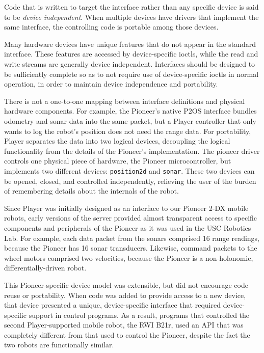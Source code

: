 Code that is written to target the interface rather than any specific
device is said to be {\em device independent}. When multiple devices have
drivers that implement the same interface, the controlling code is portable
among those devices.

Many hardware devices have unique features that do not appear in the
standard interface. These features are accessed by device-specific ioctls,
while the read and write streams are generally device independent.
Interfaces should be designed to be sufficiently complete so as to not
require use of device-specific ioctls in normal operation, in order to
maintain device independence and portability.

There is not a one-to-one mapping between interface definitions and
physical hardware components. For example, the Pioneer's native P2OS
interface bundles odometry and sonar data into the same packet, but a
Player controller that only wants to log the robot's position does
not need the range data. For portability, Player separates the data
into two logical devices, decoupling the logical functionality from
the details of the Pioneer's implementation. The pioneer driver
controls one physical piece of hardware, the Pioneer microcontroller,
but implements two different devices: {\tt position2d} and {\tt sonar}.
These two devices can be opened, closed, and controlled independently,
relieving the user of the burden of remembering details about the
internals of the robot.

Since Player was initially designed as an interface to our Pioneer 2-DX
mobile robots, early versions of the server provided almost transparent
access to specific components and peripherals of the Pioneer as it was used
in the USC Robotics Lab.  For example, each data packet from the sonars
comprised 16 range readings, because the Pioneer has 16 sonar transducers.
Likewise, command packets to the wheel motors comprised two velocities,
because the Pioneer is a non-holonomic, differentially-driven robot.

This Pioneer-specific device model was extensible, but did not encourage
code reuse or portability.  When code was added to provide
access to a new device, that device presented a unique, device-specific
interface that required device-specific support in control programs.  As a
result, programs that controlled the second Player-supported mobile
robot, the RWI B21r, used an API that was completely different from that
used to control the Pioneer, despite the fact the two robots are
functionally similar.

